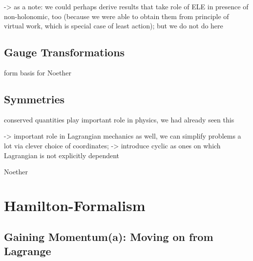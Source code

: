 \documentclass[../class_mech_main.tex]{subfiles}
\begin{document}
-> as a note: we could perhaps derive results that take role of ELE in presence of non-holonomic, too (because we were able to obtain them from principle of virtual work, which is special case of least action); but we do not do here




		\subsection{Gauge Transformations}
form basis for Noether




		\subsection{Symmetries}
conserved quantities play important role in physics, we had already seen this

-> important role in Lagrangian mechanics as well, we can simplify problems a lot via clever choice of coordinates; -> introduce cyclic as ones on which Lagrangian is not explicitly dependent

Noether



	\section{Hamilton-Formalism}


		\subsection{Gaining Momentum(a): Moving on from Lagrange}
\end{document}
